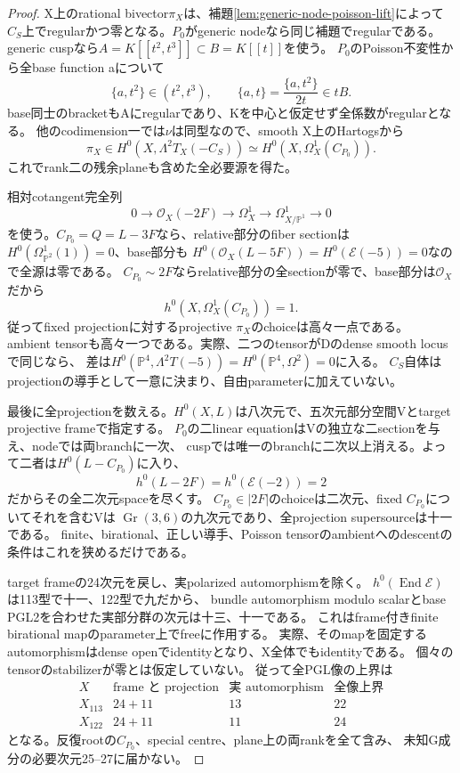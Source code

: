 \documentclass[a4paper,11pt]{ltjsarticle}
\theoremstyle{definition}
\begin{document}
\begin{proof}
X上のrational bivector$\pi_X$は、補題\ref{lem:generic-node-poisson-lift}によって
$C_S$上でregularかつ零となる。$P_0$がgeneric nodeなら同じ補題でregularである。
generic cuspなら$A=K[[t^2,t^3]]\subset B=K[[t]]$を使う。
$P_0$のPoisson不変性から全base function aについて
\[
 \{a,t^2\}\in(t^2,t^3),\qquad
 \{a,t\}=\frac{\{a,t^2\}}{2t}\in tB.
\]
base同士のbracketもAにregularであり、Kを中心と仮定せず全係数がregularとなる。
他のcodimension一では$\nu$は同型なので、smooth X上のHartogsから
\[
 \pi_X\in H^0(X,\Lambda^2T_X(-C_S))
       \simeq H^0(X,\Omega_X^1(C_{P_0})).
\]
これでrank二の残余planeも含めた全必要源を得た。

相対cotangent完全列
\[
 0\longrightarrow\mathcal O_X(-2F)\longrightarrow\Omega_X^1
   \longrightarrow\Omega_{X/\mathbb P^1}^1\longrightarrow0
\]
を使う。$C_{P_0}=Q=L-3F$なら、relative部分のfiber sectionは
$H^0(\Omega_{\mathbb P^2}^1(1))=0$、base部分も
$H^0(\mathcal O_X(L-5F))=H^0(\mathcal E(-5))=0$なので全源は零である。
$C_{P_0}\sim2F$ならrelative部分の全sectionが零で、base部分は$\mathcal O_X$だから
\[
 h^0(X,\Omega_X^1(C_{P_0}))=1.
\]
従ってfixed projectionに対するprojective $\pi_X$のchoiceは高々一点である。
ambient tensorも高々一つである。実際、二つのtensorがDのdense smooth locusで同じなら、
差は$H^0(\mathbb P^4,\Lambda^2T(-5))=H^0(\mathbb P^4,\Omega^2)=0$に入る。
$C_S$自体はprojectionの導手として一意に決まり、自由parameterに加えていない。

最後に全projectionを数える。$H^0(X,L)$は八次元で、五次元部分空間Vとtarget projective frameで指定する。
$P_0$の二linear equationはVの独立な二sectionを与え、nodeでは両branchに一次、
cuspでは唯一のbranchに二次以上消える。よって二者は$H^0(L-C_{P_0})$に入り、
\[
 h^0(L-2F)=h^0(\mathcal E(-2))=2
\]
だからその全二次元spaceを尽くす。
$C_{P_0}\in|2F|$のchoiceは二次元、fixed $C_{P_0}$についてそれを含むVは
$\operatorname{Gr}(3,6)$の九次元であり、全projection supersourceは十一である。
finite、birational、正しい導手、Poisson tensorのambientへのdescentの条件はこれを狭めるだけである。

target frameの24次元を戻し、実polarized automorphismを除く。
$h^0(\operatorname{End}\mathcal E)$は113型で十一、122型で九だから、
bundle automorphism modulo scalarとbase PGL2を合わせた実部分群の次元は十三、十一である。
これはframe付きfinite birational mapのparameter上でfreeに作用する。
実際、そのmapを固定するautomorphismはdense openでidentityとなり、X全体でもidentityである。
個々のtensorのstabilizerが零とは仮定していない。
従って全PGL像の上界は
\[
 \begin{array}{c|c|c|c}
 X&\text{frame と projection}&\text{実 automorphism}&\text{全像上界}\\ \hline
 X_{113}&24+11&13&22\\
 X_{122}&24+11&11&24
 \end{array}
\]
となる。反復rootの$C_{P_0}$、special centre、plane上の両rankを全て含み、
未知G成分の必要次元25--27に届かない。
\end{proof}
\end{document}
